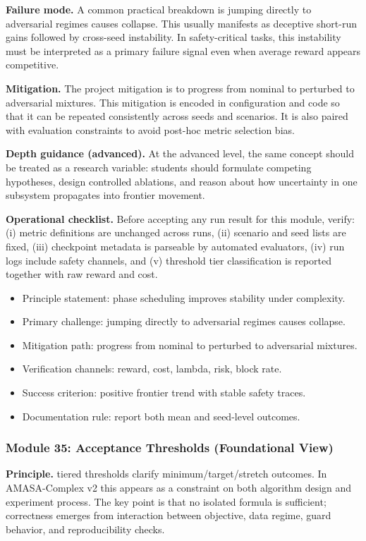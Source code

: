 \documentclass[conference]{IEEEtran}
\begin{document}
\textbf{Failure mode.} A common practical breakdown is jumping directly to adversarial regimes causes collapse. This usually manifests as deceptive short-run gains followed by cross-seed instability. In safety-critical tasks, this instability must be interpreted as a primary failure signal even when average reward appears competitive.

\textbf{Mitigation.} The project mitigation is to progress from nominal to perturbed to adversarial mixtures. This mitigation is encoded in configuration and code so that it can be repeated consistently across seeds and scenarios. It is also paired with evaluation constraints to avoid post-hoc metric selection bias.

\textbf{Depth guidance (advanced).} At the advanced level, the same concept should be treated as a research variable: students should formulate competing hypotheses, design controlled ablations, and reason about how uncertainty in one subsystem propagates into frontier movement.

\textbf{Operational checklist.} Before accepting any run result for this module, verify: (i) metric definitions are unchanged across runs, (ii) scenario and seed lists are fixed, (iii) checkpoint metadata is parseable by automated evaluators, (iv) run logs include safety channels, and (v) threshold tier classification is reported together with raw reward and cost.

\begin{itemize}[leftmargin=*]
  \item Principle statement: phase scheduling improves stability under complexity.
  \item Primary challenge: jumping directly to adversarial regimes causes collapse.
  \item Mitigation path: progress from nominal to perturbed to adversarial mixtures.
  \item Verification channels: reward, cost, lambda, risk, block rate.
  \item Success criterion: positive frontier trend with stable safety traces.
  \item Documentation rule: report both mean and seed-level outcomes.
\end{itemize}


\subsubsection{Module 35: Acceptance Thresholds (Foundational View)}
\textbf{Principle.} tiered thresholds clarify minimum/target/stretch outcomes. In AMASA-Complex v2 this appears as a constraint on both algorithm design and experiment process. The key point is that no isolated formula is sufficient; correctness emerges from interaction between objective, data regime, guard behavior, and reproducibility checks.
\end{document}

